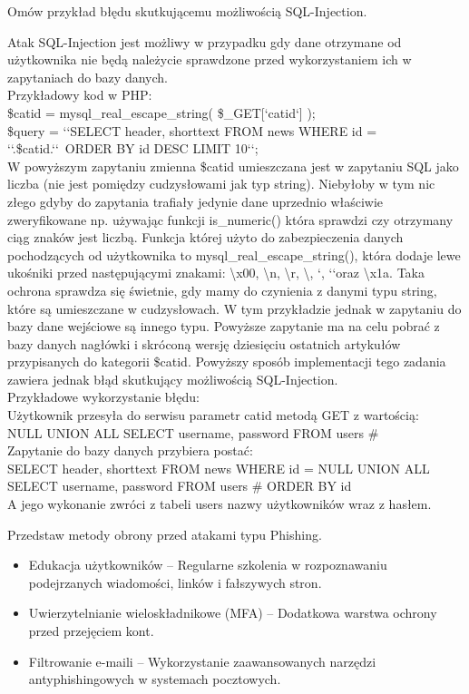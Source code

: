 \documentclass[answers,11pt]{exam}
\begin{document}
\begin{questions}
\question Omów przykład błędu skutkującemu możliwością SQL-Injection.
\begin{solution}
Atak SQL-Injection jest możliwy w przypadku gdy dane otrzymane od użytkownika nie będą należycie sprawdzone przed wykorzystaniem ich w zapytaniach do bazy danych.\\
Przykładowy kod w PHP:\\
\$catid = mysql\_real\_escape\_string( \$\_GET[\lq catid\lq ] );\\
\$query = \lq\lq SELECT header, shorttext FROM news WHERE id = \lq\lq.\$catid.\lq\lq\ ORDER BY id DESC LIMIT 10\lq\lq;\\
W powyższym zapytaniu zmienna \$catid umieszczana jest w zapytaniu SQL jako liczba (nie jest pomiędzy cudzysłowami jak typ string). Niebyłoby w tym nic złego gdyby do zapytania trafiały jedynie dane uprzednio właściwie zweryfikowane np. używając funkcji is\_numeric() która sprawdzi czy otrzymany ciąg znaków jest liczbą. Funkcja której użyto do zabezpieczenia danych pochodzących od użytkownika to mysql\_real\_escape\_string(), która dodaje lewe ukośniki przed następującymi znakami: \textbackslash x00, \textbackslash n, \textbackslash r, \textbackslash, \lq, \lq\lq oraz \textbackslash x1a. Taka ochrona sprawdza się świetnie, gdy mamy do czynienia z danymi typu string, które są umieszczane w cudzysłowach. W tym przykładzie jednak w zapytaniu do bazy dane wejściowe są  innego typu. Powyższe zapytanie ma na celu pobrać z bazy danych nagłówki i skróconą wersję dziesięciu ostatnich artykułów przypisanych do kategorii \$catid. Powyższy sposób implementacji tego zadania zawiera jednak błąd skutkujący możliwością SQL-Injection.\\
Przykładowe wykorzystanie błędu:\\
Użytkownik przesyła do serwisu parametr catid metodą GET z wartością:\\
NULL UNION ALL SELECT username, password FROM users \# \\
Zapytanie do bazy danych przybiera postać:\\
SELECT header, shorttext FROM news WHERE id = NULL UNION ALL SELECT username, password FROM users \# ORDER BY id\\
A jego wykonanie zwróci z tabeli users nazwy użytkowników wraz z hasłem.
\end{solution}

\question Przedstaw metody obrony przed atakami typu Phishing.
\begin{solution}
\begin{itemize}
\item Edukacja użytkowników – Regularne szkolenia w rozpoznawaniu podejrzanych wiadomości, linków i fałszywych stron.
\item Uwierzytelnianie wieloskładnikowe (MFA) – Dodatkowa warstwa ochrony przed przejęciem kont.
\item Filtrowanie e-maili – Wykorzystanie zaawansowanych narzędzi antyphishingowych w systemach pocztowych.
\end{itemize}
\end{solution}

\end{questions}
\end{document}
